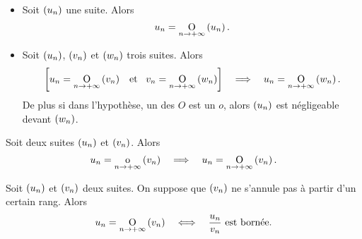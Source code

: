 \documentclass{magnolia}
\begin{document}
\begin{proposition}[utile=-3]
$\quad$
\begin{itemize}
\item Soit $\left(u_n\right)$ une suite. Alors
  \[u_n=\underset{n \rightarrow +\infty}{\text{O}}\left(u_n\right).\]
\item Soit $\left(u_n\right)$, $\left(v_n\right)$ et $\left(w_n\right)$ trois suites. Alors
  \[\left[u_n=\underset{n \rightarrow +\infty}{\text{O}}\left(v_n\right) \quad\!\text{et}\quad\! v_n=\underset{n \rightarrow +\infty}{\text{O}}\left(w_n\right)\right]
    \quad\Longrightarrow\quad u_n=\underset{n \rightarrow +\infty}{\text{O}}\left(w_n\right).\]
  De plus si dans l'hypothèse, un des $O$ est un $o$, alors $\left(u_n\right)$ est
  négligeable devant $\left(w_n\right)$.
\end{itemize}
\end{proposition}

\begin{proposition}[utile=-3]
Soit deux suites $\left(u_n\right)$ et $\left(v_n\right)$. Alors
\[u_n=\underset{n \rightarrow +\infty}{\text{o}}\left(v_n\right) \quad\Longrightarrow\quad
  u_n=\underset{n \rightarrow +\infty}{\text{O}}\left(v_n\right).\]
\end{proposition}

\begin{proposition}[utile=-3]
Soit $\left(u_n\right)$ et $\left(v_n\right)$ deux suites. On suppose que $\left(v_n\right)$ ne s'annule pas à
partir d'un certain rang. Alors
\[u_n=\underset{n \rightarrow +\infty}{\text{O}}\left(v_n\right) \quad\Longleftrightarrow\quad
  \text{$\frac{u_n}{v_n}$ est bornée}.\]
\end{proposition}



\end{document}
